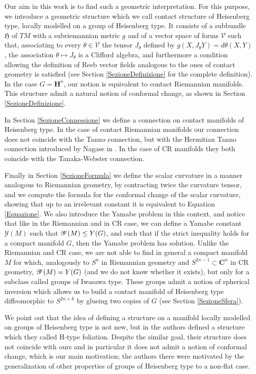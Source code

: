 \documentclass{article}
\newcommand{\ci}[1]{\mathscr{#1}}%
\newcommand{\g}[1]{\mathfrak{#1}}
\newcommand{\C}{\mathbf{C}}
\renewcommand{\H}{\mathbf{H}}
\theoremstyle{definition}
\theoremstyle{remark}
\begin{document}
Our aim in this work is to find such a geometric interpretation.
For this purpose, we introduce a geometric structure which we call contact structure of Heisenberg type, locally modelled on a group of Heisenberg type. It consists of a subbundle $\g{H}$ of $TM$ with a subriemannian metric $g$ and of a vector space of forms $\ci{V}$ such that, associating to every $\theta\in\ci{V}$ the tensor $J_{\theta}$ defined by $g(X,J_{\theta}Y)=d\theta(X,Y)$, the association $\theta\mapsto J_{\theta}$ is a Clifford algebra, and furthermore a condition allowing the definition of Reeb vector fields analogous to the ones of contact geometry is satisfied (see Section \ref{SezioneDefinizione} for the complete definition).
In the case $G=\H^n$, our notion is equivalent to contact Riemannian manifolds.
This structure admit a natural notion of conformal change, as shown in Section \ref{SezioneDefinizione}.

In Section \ref{SezioneConnessione} we define a connection on contact manifolds of Heisenberg type. In the case of contact Riemannian manifolds our connection does not coincide with the Tanno connection, but with the Hermitian Tanno connection introduced by Nagase in \cite{N}. In the case of CR manifolds they both coincide with the Tanaka-Webster connection.

Finally in Section \ref{SezioneFormula} we define the scalar curvature in a manner analogous to Riemannian geometry, by contracting twice the curvature tensor, and we compute the formula for the conformal change of the scalar curvature, showing that up to an irrelevant constant it is equivalent to Equation \eqref{Equazione}.
We also introduce the Yamabe problem in this context, and notice that like in the Riemannian and in CR case, we can define a Yamabe constant $\ci{Y}(M)$ such that $\ci{Y}(M)\le\ci\ci{Y}(G)$, and such that if the strict inequality holds for a compact manifold $G$, then the Yamabe problem has solution.
Unlike the Riemannian and CR case, we are not able to find in general a compact manifold $M$ for which, analogously to $S^n$ in Riemannian geometry and $S^{2n-1}\subset\C^n$ in CR geometry, $\ci{Y}(M)=\ci\ci{Y}(G)$ (and we do not know whether it exists), but only for a subclass called groups of Iwasawa type. These groups admit a notion of spherical inversion which allows us to build a contact manifold of Heisenberg type diffeomorphic to $S^{2n+k}$ by glueing two copies of $G$ (see Section \ref{SezioneSfera}).

We point out that the idea of defining a structure on a manifold locally modelled on groups of Heisenberg type is not new, but in \cite{BGRV} the authors defined a structure which they called H-type foliation. Despite the similar goal, their structure does not coincide with ours and in particular it does not admit a notion of conformal change, which is our main motivation; the authors there were motivated by the generalization of other properties of groups of Heisenberg type to a non-flat case.
\end{document}
